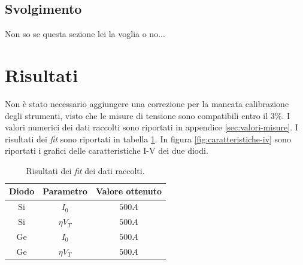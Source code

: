 \documentclass[11pt, a4paper, twocolumn]{article}
\begin{document}
  \subsection{Svolgimento}\label{subsec:svolgimento}
  Non so se questa sezione lei la voglia o no...

\section{Risultati}\label{sec:risultati}
  Non è stato necessario aggiungere una correzione per la mancata calibrazione degli strumenti, visto che le misure di
  tensione sono compatibili entro il $3\%$. %
  I valori numerici dei dati raccolti sono riportati in appendice \ref{sec:valori-misure}.
  I risultati dei \emph{fit} sono riportati in tabella \ref{tab:risultati-fit}.
  In figura \ref{fig:caratteristiche-iv} sono riportati i grafici delle caratteristiche I-V dei due diodi.
  \begin{table}[H]
    \centering
    \begin{tabular}[t]{ccc}
      \toprule
      Diodo& Parametro &Valore ottenuto\\
      \midrule
      Si & $I_0$ &  $500A$ \\
      Si & $\eta V_T$ &  $500A$ \\
      Ge & $I_0$ &  $500A$ \\
      Ge & $\eta V_T$ &  $500A$ \\
      \bottomrule
      \end{tabular}
    \caption{
      Risultati dei \emph{fit} dei dati raccolti.
    }
    \label{tab:risultati-fit}
  \end{table}
\end{document}
